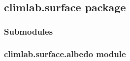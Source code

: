 \documentclass[letterpaper,10pt,english]{sphinxmanual}
\begin{document}
\subsection{climlab.surface package}
\label{api/climlab.surface:climlab-surface-package}\label{api/climlab.surface::doc}

\subsubsection{Submodules}
\label{api/climlab.surface:submodules}

\subsubsection{climlab.surface.albedo module}
\label{api/climlab.surface:module-climlab.surface.albedo}\label{api/climlab.surface:climlab-surface-albedo-module}
\end{document}
